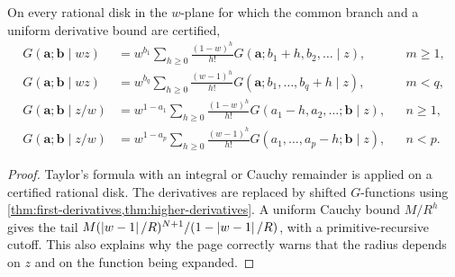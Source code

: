 \begin{theorem}\label{thm:scaling-series}
On every rational disk in the $w$-plane for which the common branch and a
uniform derivative bound are certified,
\begin{align}
G(\mathbf a;\mathbf b\mid wz)
&=w^{b_1}\sum_{h\ge0}\frac{(1-w)^h}{h!}
  G(\mathbf a;b_1+h,b_2,\ldots\mid z),&&m\ge1,
\label{eq:scale-b1}\\
G(\mathbf a;\mathbf b\mid wz)
&=w^{b_q}\sum_{h\ge0}\frac{(w-1)^h}{h!}
  G(\mathbf a;b_1,\ldots,b_q+h\mid z),&&m<q,
\label{eq:scale-bq}\\
G(\mathbf a;\mathbf b\mid z/w)
&=w^{1-a_1}\sum_{h\ge0}\frac{(1-w)^h}{h!}
  G(a_1-h,a_2,\ldots;\mathbf b\mid z),&&n\ge1,
\label{eq:scale-a1}\\
G(\mathbf a;\mathbf b\mid z/w)
&=w^{1-a_p}\sum_{h\ge0}\frac{(w-1)^h}{h!}
  G(a_1,\ldots,a_p-h;\mathbf b\mid z),&&n<p.
\label{eq:scale-ap}
\end{align}
\end{theorem}
\begin{proof}
Taylor's formula with an integral or Cauchy remainder is applied on a certified
rational disk.  The derivatives are replaced by shifted $G$-functions using
\cref{thm:first-derivatives,thm:higher-derivatives}.  A uniform Cauchy bound
$M/R^h$ gives the tail
$M(\left|w-1\right|/R)^{N+1}/(1-\left|w-1\right|/R)$, with a primitive-recursive cutoff.
This also explains why the page correctly warns that the radius depends on
$z$ and on the function being expanded.
\end{proof}
